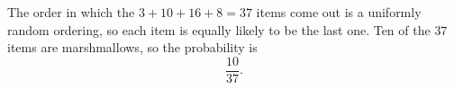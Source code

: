 The order in which the $3+10+16+8=37$ items come out is a uniformly random ordering, so each item is equally likely to be the last one. Ten of the $37$ items are marshmallows, so the probability is
\[
\boxed{\dfrac{10}{37}}.
\]
